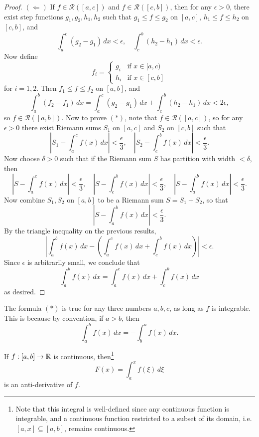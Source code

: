 \begin{proof}
  $(\Leftarrow)$ If $f \in \mathcal{R}([a, c])$ and
  $f \in \mathcal{R}([c, b])$, then for any
  $\epsilon > 0$, there exist step functions
  $g_1, g_2, h_1, h_2$ such that
  $g_1 \le f \le g_2$ on $[a, c]$,
  $h_1 \le f \le h_2$ on $[c, b]$, and
  \[
    \int_a^c (g_2 - g_1)\, dx < \epsilon,
    \quad
    \int_c^b (h_2 - h_1)\, dx < \epsilon.
  \]
  Now define
  \[
    f_i = \begin{cases}
      g_i & \text{if } x \in [a, c) \\
      h_i & \text{if } x \in [c, b]
    \end{cases}
  \]
  for $i = 1, 2$. Then $f_1 \le f \le f_2$ on $[a, b]$,
  and
  \[
    \int_a^b (f_2 - f_1)\, dx
    = \int_a^c (g_2 - g_1)\, dx + \int_c^b (h_2 - h_1)\, dx
    < 2\epsilon,
  \]
  so $f \in \mathcal{R}([a, b])$. Now to prove $(*)$,
  note that $f \in \mathcal{R}([a, c])$, so for
  any $\epsilon > 0$ there exist Riemann sums $S_1$
  on $[a, c]$ and $S_2$ on $[c, b]$ such that
  \[
    |S_1 - \int_a^c f(x)\, dx| < \frac{\epsilon}{3},
    \quad
    |S_2 - \int_c^b f(x)\, dx| < \frac{\epsilon}{3}.
  \]
  Now choose $\delta > 0$ such that if the Riemann
  sum $S$ has partition with
  width $< \delta$, then
  \[
    |S - \int_a^c f(x)\, dx| < \frac{\epsilon}{3},
    \quad
    |S - \int_c^b f(x)\, dx| < \frac{\epsilon}{3},
    \quad
    |S - \int_a^b f(x)\, dx| < \frac{\epsilon}{3}.
  \]
  Now combine $S_1, S_2$ on $[a, b]$ to be a Riemann
  sum $S = S_1 + S_2$, so that
  \[
    |S - \int_a^b f(x)\, dx| < \frac{\epsilon}{3}.
  \]
  By the triangle inequality on the previous results,
  \[
    \left| \int_a^b f(x)\, dx - \left(\int_a^c f(x)\, dx + \int_c^b f(x)\, dx\right)\right| < \epsilon.
  \]
  Since $\epsilon$ is arbitrarily small, we conclude that
  \[
    \int_a^b f(x)\, dx = \int_a^c f(x)\, dx + \int_c^b f(x)\, dx
  \]
  as desired.
\end{proof}

\begin{remark}
  The formula $(*)$ is true for any three numbers
  $a, b, c$, as long as $f$ is integrable. This is
  because by convention, if $a > b$, then
  \[
    \int_a^b f(x)\, dx = -\int_b^a f(x)\, dx.
  \]
\end{remark}

\begin{theorem}
  If $f : [a, b] \to \mathbb{R}$ is continuous, then\footnote{Note that this integral is well-defined since any continuous function is integrable, and a continuous function restricted to a subset of its domain, i.e. $[a, x] \subseteq [a, b]$, remains continuous.}
  \[
    F(x) = \int_a^x f(\xi) \, d\xi
  \]
  is an anti-derivative of $f$.
\end{theorem}

